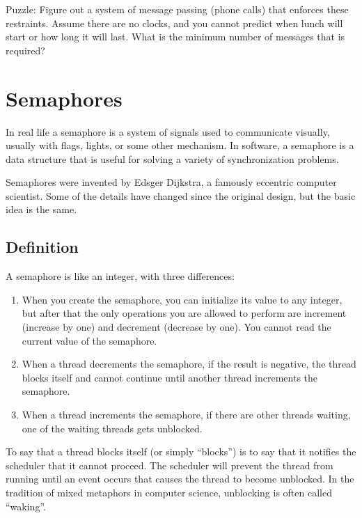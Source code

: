 \documentclass{book}
\begin{document}
Puzzle: Figure out a system of message passing (phone calls) that
enforces these restraints.  Assume there are no clocks, and you
cannot predict when lunch will start or how long it will last.  What
is the minimum number of messages that is required?



\chapter{Semaphores}

In real life a semaphore is a system of signals used to communicate
visually, usually with flags, lights, or some other mechanism.  In
software, a semaphore is a data structure that is useful for solving a
variety of synchronization problems.

Semaphores were invented by Edsger Dijkstra, a famously eccentric
computer scientist.  Some of the details have changed since the
original design, but the basic idea is the same.

\section{Definition}

A semaphore is like an integer, with three differences:

\begin{enumerate}

    \item When you create the semaphore, you can initialize its value to
          any integer, but after that the only operations you are allowed to
          perform are increment (increase by one) and decrement (decrease by
          one).  You cannot read the current value of the semaphore.

    \item When a thread decrements the semaphore, if the result is
          negative, the thread blocks itself and cannot continue until another
          thread increments the semaphore.

    \item When a thread increments the semaphore, if there are other
          threads waiting, one of the waiting threads gets unblocked.

\end{enumerate}

To say that a thread blocks itself (or simply ``blocks'') is to say
that it notifies the scheduler that it cannot proceed.  The scheduler
will prevent the thread from running until an event occurs that causes
the thread to become unblocked.  In the tradition of mixed metaphors
in computer science, unblocking is often called ``waking''.
\end{document}
